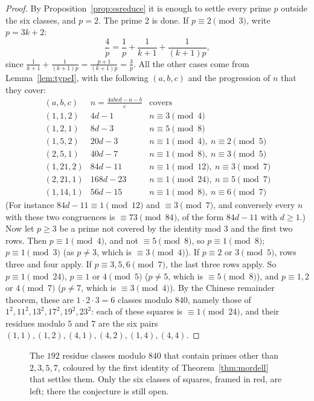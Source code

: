 \begin{proof}
By Proposition~\ref{prop:esreduce} it is enough to settle every prime $p$ outside the six classes, and $p=2$. The prime $2$ is done. If $p\equiv2\pmod3$,
write $p=3k+2$:
\[
\frac4p=\frac1p+\frac1{k+1}+\frac1{(k+1)p},
\]
since $\frac1{k+1}+\frac1{(k+1)p}=\frac{p+1}{(k+1)p}=\frac3p$. All the other cases come from Lemma~\ref{lem:typeI}, with the following $(a,b,c)$ and the
progression of $n$ that they cover:
\[
\begin{array}{lll}
(a,b,c)&n=\frac{4abcd-a-b}c&\text{covers}\\\hline
(1,1,2)&4d-1&n\equiv3\pmod4\\
(1,2,1)&8d-3&n\equiv5\pmod8\\
(1,5,2)&20d-3&n\equiv1\pmod4,\ n\equiv2\pmod5\\
(2,5,1)&40d-7&n\equiv1\pmod8,\ n\equiv3\pmod5\\
(1,21,2)&84d-11&n\equiv1\pmod{12},\ n\equiv3\pmod7\\
(2,21,1)&168d-23&n\equiv1\pmod{24},\ n\equiv5\pmod7\\
(1,14,1)&56d-15&n\equiv1\pmod8,\ n\equiv6\pmod7
\end{array}
\]
(For instance $84d-11\equiv1\pmod{12}$ and $\equiv3\pmod7$, and conversely every $n$ with these two congruences is $\equiv73\pmod{84}$, of the form
$84d-11$ with $d\ge1$.) Now let $p\ge3$ be a prime not covered by the identity mod $3$ and the first two rows. Then $p\equiv1\pmod4$, and not
$\equiv5\pmod8$, so $p\equiv1\pmod8$; $p\equiv1\pmod3$ (as $p\ne3$, which is $\equiv3\pmod4$). If $p\equiv2$ or $3\pmod5$, rows three and four apply. If
$p\equiv3,5,6\pmod7$, the last three rows apply. So $p\equiv1\pmod{24}$, $p\equiv1$ or $4\pmod5$ ($p\ne5$, which is $\equiv5\pmod8$), and $p\equiv1,2$ or
$4\pmod7$ ($p\ne7$, which is $\equiv3\pmod4$). By the Chinese remainder theorem, these are $1\cdot2\cdot3=6$ classes modulo $840$, namely those of
$1^2,11^2,13^2,17^2,19^2,23^2$: each of these squares is $\equiv1\pmod{24}$, and their residues modulo $5$ and $7$ are the six pairs
$(1,1),(1,2),(4,1),(4,2),(1,4),(4,4)$.
\end{proof}

\begin{figure}[ht]
\centering
{}
\caption{The $192$ residue classes modulo $840$ that contain primes other than $2,3,5,7$, coloured by the first identity of Theorem~\ref{thm:mordell}
that settles them. Only the six classes of squares, framed in red, are left; there the conjecture is still open.}
\label{fig:es}
\end{figure}

